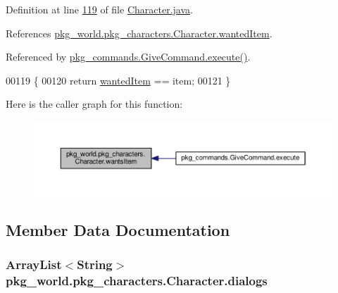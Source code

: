 Definition at line \hyperlink{Character_8java_source_l00119}{119} of file \hyperlink{Character_8java_source}{Character.\-java}.



References \hyperlink{Character_8java_source_l00030}{pkg\-\_\-world.\-pkg\-\_\-characters.\-Character.\-wanted\-Item}.



Referenced by \hyperlink{GiveCommand_8java_source_l00029}{pkg\-\_\-commands.\-Give\-Command.\-execute()}.


\begin{DoxyCode}
00119                                         \{
00120         \textcolor{keywordflow}{return} \hyperlink{classpkg__world_1_1pkg__characters_1_1Character_a3e5abf14759d18446163db9597d10a44}{wantedItem} == item;
00121     \}
\end{DoxyCode}


Here is the caller graph for this function\-:
\nopagebreak
\begin{figure}[H]
\begin{center}
\leavevmode
\includegraphics[width=350pt]{classpkg__world_1_1pkg__characters_1_1Character_a816f8f79ef1e8c9635f0cdeb180b9f3f_icgraph}
\end{center}
\end{figure}




\subsection{Member Data Documentation}
\hypertarget{classpkg__world_1_1pkg__characters_1_1Character_a4747943f9a5d0f11605230df4d2559d2}{
\subsubsection[{dialogs}]{\setlength{\rightskip}{0pt plus 5cm}Array\-List$<$String$>$ pkg\-\_\-world.\-pkg\-\_\-characters.\-Character.\-dialogs\hspace{0.3cm}{\ttfamily [private]}}}\label{classpkg__world_1_1pkg__characters_1_1Character_a4747943f9a5d0f11605230df4d2559d2}


